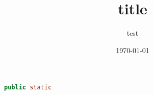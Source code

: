 \documentclass{article}
\title{title}\author{test}\date{\today}
\begin{document}

\begin{lstlisting}[style=defaultstyle, language=Java, caption={}]
public static 
\end{lstlisting}
\end{document}

